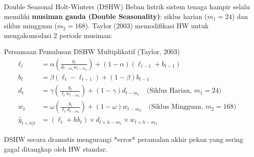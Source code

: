 \documentclass[aspectratio=169, 10pt]{beamer}
\begin{document}
\begin{frame}{Double Seasonal Holt-Winters (DSHW)}
    Beban listrik sistem tenaga hampir selalu memiliki \textbf{musiman ganda (Double Seasonality)}: siklus harian ($m_1 = 24$) dan siklus mingguan ($m_2 = 168$). Taylor (2003) memodifikasi HW untuk mengakomodasi 2 periode musiman:
    \begin{block}{Persamaan Pemulusan DSHW Multiplikatif (Taylor, 2003)}
        \begin{align*}
            \ell_t &= \alpha \left(\frac{y_t}{d_{t-m_1} w_{t-m_2}}\right) + (1 - \alpha)(\ell_{t-1} + b_{t-1}) \\
            b_t &= \beta (\ell_t - \ell_{t-1}) + (1 - \beta) b_{t-1} \\
            d_t &= \gamma \left(\frac{y_t}{\ell_t w_{t-m_2}}\right) + (1 - \gamma) d_{t-m_1} \quad \text{(Siklus Harian, } m_1=24\text{)}\\
            w_t &= \omega \left(\frac{y_t}{\ell_t d_{t-m_1}}\right) + (1 - \omega) w_{t-m_2} \quad \text{(Siklus Mingguan, } m_2=168\text{)}\\
            \hat{y}_{t+h|t} &= (\ell_t + h b_t) \times d_{t+h-m_1} \times w_{t+h-m_2}
        \end{align*}
    \end{block}
    DSHW secara dramatis mengurangi *error* peramalan akhir pekan yang sering gagal ditangkap oleh HW standar.
\end{frame}
\end{document}
